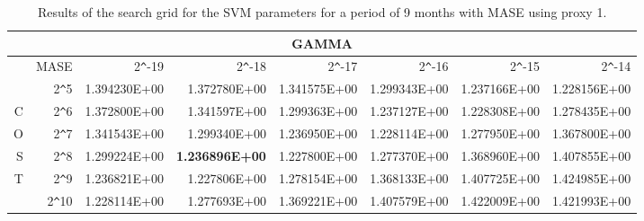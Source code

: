 \begin{table}[h!]
\centering
\begin{adjustbox}{width=\textwidth}
\begin{tabular}{|r|r|rrrrrr|}
\hline
\multicolumn{8}{|c|}{GAMMA} \tabularnewline
\hline
 &MASE& 2\verb|^|-19 & 2\verb|^|-18 & 2\verb|^|-17 & 2\verb|^|-16 & 2\verb|^|-15 & 2\verb|^|-14 \\ 
  \hline
  &2\verb|^|5 & 1.394230E+00 & 1.372780E+00 & 1.341575E+00 & 1.299343E+00 & 1.237166E+00 & 1.228156E+00 \\ 
  C&2\verb|^|6 & 1.372800E+00 & 1.341597E+00 & 1.299363E+00 & 1.237127E+00 & 1.228308E+00 & 1.278435E+00 \\ 
  O&2\verb|^|7 & 1.341543E+00 & 1.299340E+00 & 1.236950E+00 & 1.228114E+00 & 1.277950E+00 & 1.367800E+00 \\ 
  S&2\verb|^|8 & 1.299224E+00 & \textbf{1.236896E+00} & 1.227800E+00 & 1.277370E+00 & 1.368960E+00 & 1.407855E+00 \\ 
  T&2\verb|^|9 & 1.236821E+00 & 1.227806E+00 & 1.278154E+00 & 1.368133E+00 & 1.407725E+00 & 1.424985E+00 \\ 
  &2\verb|^|10 & 1.228114E+00 & 1.277693E+00 & 1.369221E+00 & 1.407579E+00 & 1.422009E+00 & 1.421993E+00 \\ 
   \hline
\end{tabular}
\end{adjustbox}
\caption{Results of the search grid for the SVM parameters for a period of 9 months with MASE using proxy 1.}
\end{table}